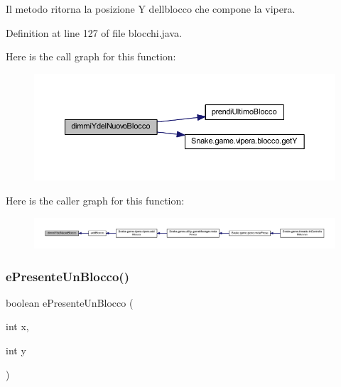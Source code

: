 Il metodo ritorna la posizione Y dell\textquotesingle{}blocco che compone la vipera. 



Definition at line 127 of file blocchi.\+java.

Here is the call graph for this function\+:
\nopagebreak
\begin{figure}[H]
\begin{center}
\leavevmode
\includegraphics[width=350pt]{class_snake_1_1game_1_1vipera_1_1blocchi_a78a0129c937328d9bd0dafc68d007aef_cgraph}
\end{center}
\end{figure}
Here is the caller graph for this function\+:
\nopagebreak
\begin{figure}[H]
\begin{center}
\leavevmode
\includegraphics[width=350pt]{class_snake_1_1game_1_1vipera_1_1blocchi_a78a0129c937328d9bd0dafc68d007aef_icgraph}
\end{center}
\end{figure}
\mbox{\label{class_snake_1_1game_1_1vipera_1_1blocchi_ac24833a417b3bd7c60e29ed5b7edc29f}} 
\subsubsection{\texorpdfstring{e\+Presente\+Un\+Blocco()}{ePresenteUnBlocco()}}
{\footnotesize\ttfamily boolean e\+Presente\+Un\+Blocco (\begin{DoxyParamCaption}\item[{int}]{x,  }\item[{int}]{y }\end{DoxyParamCaption})}



